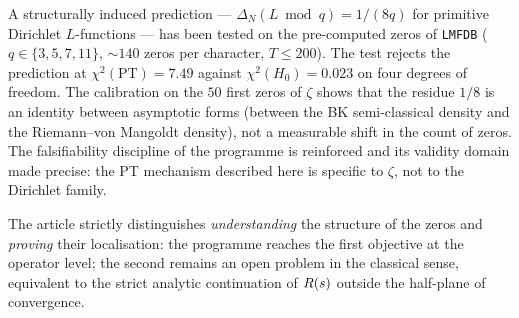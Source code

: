 A structurally induced prediction --- $\Delta_N(L \bmod q) = 1/(8q)$ for
primitive Dirichlet $L$-functions --- has been tested on the pre-computed
zeros of \texttt{LMFDB} ($q \in \{3,5,7,11\}$, $\sim 140$ zeros per
character, $T \le 200$). The test rejects the prediction at
$\chi^{2}(\mathrm{PT}) = 7.49$ against $\chi^{2}(H_0) = 0.023$ on four
degrees of freedom. The calibration on the $50$ first zeros of $\zeta$
shows that the residue $1/8$ is an identity between asymptotic forms
(between the BK semi-classical density and the Riemann--von Mangoldt
density), not a measurable shift in the count of zeros. The falsifiability
discipline of the programme is reinforced and its validity domain made
precise: the PT mechanism described here is specific to $\zeta$, not to the
Dirichlet family.

The article strictly distinguishes \emph{understanding} the structure of
the zeros and \emph{proving} their localisation: the programme reaches the
first objective at the operator level; the second remains an open problem
in the classical sense, equivalent to the strict analytic continuation of
$R(s)$ outside the half-plane of convergence.
